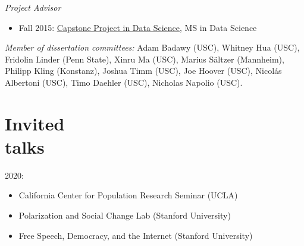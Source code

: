 \documentclass[margin,line,11pt]{resume}
\begin{document}
\begin{resume}
\emph{Project Advisor}
\begin{itemize}
\item Fall 2015: \href{http://cds.nyu.edu/academics/ms-in-data-science/curriculum/required-courses/#ds-ga-1006}{Capstone Project in Data Science}, MS in Data Science
\end{itemize}

\emph{Member of dissertation committees:} Adam Badawy (USC), Whitney Hua (USC), Fridolin Linder (Penn State), Xinru Ma (USC), Marius S\"{a}ltzer (Mannheim), Philipp Kling (Konstanz), Joshua Timm (USC), Joe Hoover (USC), Nicol\'{a}s Albertoni (USC), Timo Daehler (USC), Nicholas Napolio (USC).




        \section{\mysidestyle Invited\\talks}
2020:
\begin{itemize}
\item California Center for Population Research Seminar (UCLA)
\item Polarization and Social Change Lab (Stanford University)
\item Free Speech, Democracy, and the Internet (Stanford University)
\end{itemize}    
    

\end{resume}
\end{document}
